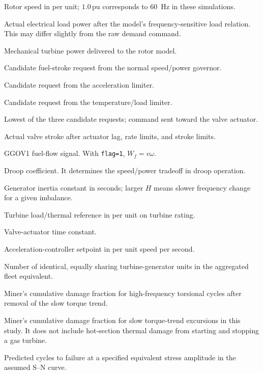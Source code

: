 \documentclass[11pt]{article}
\newcommand{\pu}{\,\mathrm{pu}}
\newcommand{\fsrn}{\ensuremath{\mathrm{FSRN}}}
\newcommand{\fsra}{\ensuremath{\mathrm{FSRA}}}
\newcommand{\fsrt}{\ensuremath{\mathrm{FSRT}}}
\newcommand{\fsr}{\ensuremath{\mathrm{FSR}}}
\newcommand{\Pe}{\ensuremath{P_{e}}}
\newcommand{\Pm}{\ensuremath{P_{m}}}
\begin{document}
\begin{description}[style=nextline,leftmargin=2.4cm]
  \item[$\omega$] Rotor speed in per unit; $1.0\pu$ corresponds to
    \SI{60}{Hz} in these simulations.
  \item[$\Pe$] Actual electrical load power after the model's
    frequency-sensitive load relation.  This may differ slightly from the raw
    demand command.
  \item[$\Pm$] Mechanical turbine power delivered to the rotor model.
  \item[$\fsrn$] Candidate fuel-stroke request from the normal speed/power
    governor.
  \item[$\fsra$] Candidate request from the acceleration limiter.
  \item[$\fsrt$] Candidate request from the temperature/load limiter.
  \item[$\fsr$] Lowest of the three candidate requests; command sent toward the
    valve actuator.
  \item[$v$] Actual valve stroke after actuator lag, rate limits, and stroke
    limits.
  \item[$W_f$] GGOV1 fuel-flow signal.  With \texttt{flag=1}, $W_f=v\omega$.
  \item[$R$] Droop coefficient.  It determines the speed/power tradeoff in
    droop operation.
  \item[$H$] Generator inertia constant in seconds; larger $H$ means slower
    frequency change for a given imbalance.
  \item[$Ldref$] Turbine load/thermal reference in per unit on turbine rating.
  \item[$T_{act}$] Valve-actuator time constant.
  \item[$a_{set}$] Acceleration-controller setpoint in per unit speed per
    second.
  \item[$N$] Number of identical, equally sharing turbine-generator units in
    the aggregated fleet equivalent.
  \item[$D_{HCF}$] Miner's cumulative damage fraction for high-frequency
    torsional cycles after removal of the slow torque trend.
  \item[$D_{LCF}$] Miner's cumulative damage fraction for slow torque-trend
    excursions in this study.  It does not include hot-section thermal damage
    from starting and stopping a gas turbine.
  \item[$N_f$] Predicted cycles to failure at a specified equivalent stress
    amplitude in the assumed S--N curve.
\end{description}
\end{document}
